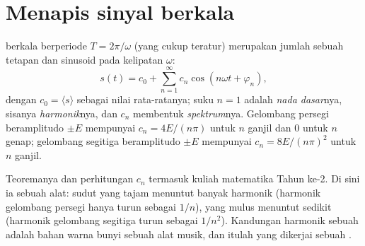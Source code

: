 \section{Menapis sinyal berkala}

\begin{theorem}\label{thm:b1:filters-transfer-functions:fourier}
 berkala berperiode $T = 2\pi/\omega$ (yang cukup teratur)
merupakan jumlah sebuah tetapan dan sinusoid pada kelipatan $\omega$:
\[
s(t) = c_0 + \sum_{n = 1}^{\infty} c_n\cos(n\omega t + \varphi_n),
\]
dengan $c_0 = \langle s\rangle$ sebagai nilai rata-ratanya; suku $n = 1$
adalah \emph{nada dasar}nya, sisanya \emph{harmonik}nya, dan 
$c_n$ membentuk \emph{spektrum}nya. Gelombang persegi beramplitudo
$\pm E$ mempunyai $c_n = 4E/(n\pi)$ untuk $n$ ganjil dan $0$ untuk $n$
genap; gelombang segitiga beramplitudo $\pm E$ mempunyai
$c_n = 8E/(n\pi)^2$ untuk $n$ ganjil.
\end{theorem}
\admitted

\begin{remark}\label{rem:b1:filters-transfer-functions:fourier}
Teoremanya dan perhitungan $c_n$ termasuk kuliah matematika Tahun ke-2.
Di sini ia sebuah alat: sudut yang tajam menuntut banyak harmonik
(harmonik gelombang persegi hanya turun sebagai $1/n$),  yang
mulus menuntut sedikit (harmonik gelombang segitiga turun sebagai
$1/n^2$). Kandungan harmonik sebuah  adalah bahan warna bunyi
sebuah alat musik, dan itulah yang dikerjai sebuah .
\end{remark}


